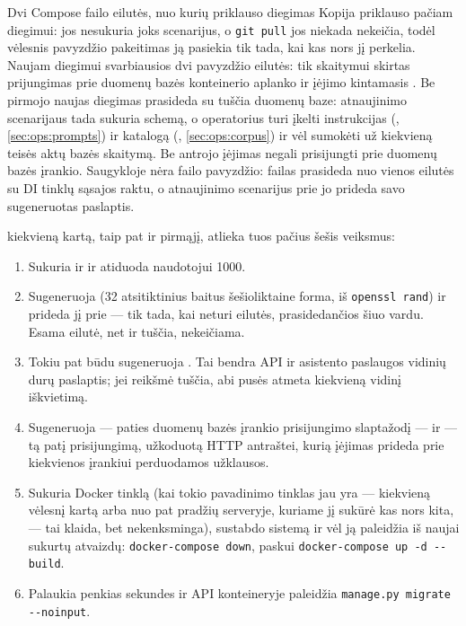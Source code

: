 \begin{notebox}{Dvi Compose failo eilutės, nuo kurių priklauso diegimas}
Kopija priklauso pačiam diegimui: jos nesukuria joks scenarijus, o \texttt{git pull} jos niekada
nekeičia, todėl vėlesnis pavyzdžio pakeitimas ją pasiekia tik tada, kai kas nors jį perkelia.
Naujam diegimui svarbiausios dvi pavyzdžio eilutės: tik skaitymui skirtas
 prijungimas prie duomenų
bazės konteinerio aplanko  ir įėjimo kintamasis
. Be pirmojo naujas diegimas prasideda su tuščia duomenų baze:
atnaujinimo scenarijaus  tada sukuria schemą, o operatorius turi įkelti instrukcijas
(, \cref{sec:ops:prompts}) ir katalogą (,
\cref{sec:ops:corpus}) ir vėl sumokėti už kiekvieną teisės aktų bazės skaitymą. Be antrojo įėjimas
negali prisijungti prie duomenų bazės įrankio. Saugykloje nėra failo  pavyzdžio:
failas prasideda nuo vienos eilutės su DI tinklų sąsajos raktu, o atnaujinimo scenarijus prie jo
prideda savo sugeneruotas paslaptis.
\end{notebox}

 kiekvieną kartą, taip pat ir pirmąjį, atlieka tuos pačius šešis
veiksmus:

\begin{enumerate}
  \item Sukuria  ir  ir atiduoda 
    naudotojui 1000.
  \item Sugeneruoja  (32 atsitiktinius baitus šešioliktaine forma, iš
    \texttt{openssl rand}) ir prideda jį prie  --- tik tada, kai  neturi
    eilutės, prasidedančios šiuo vardu. Esama eilutė, net ir tuščia, nekeičiama.
  \item Tokiu pat būdu sugeneruoja . Tai bendra API ir asistento
    paslaugos vidinių durų paslaptis; jei reikšmė tuščia, abi pusės atmeta kiekvieną vidinį
    iškvietimą.
  \item Sugeneruoja  --- paties duomenų bazės įrankio prisijungimo slaptažodį
    --- ir  --- tą patį prisijungimą, užkoduotą HTTP antraštei, kurią
    įėjimas prideda prie kiekvienos įrankiui perduodamos užklausos.
  \item Sukuria Docker tinklą  (kai tokio pavadinimo tinklas jau yra ---
    kiekvieną vėlesnį kartą arba nuo pat pradžių serveryje, kuriame jį sukūrė kas nors kita, ---
    tai klaida, bet nekenksminga), sustabdo sistemą ir vėl ją paleidžia iš naujai sukurtų atvaizdų:
    \texttt{docker-compose down}, paskui \texttt{docker-compose up -d -{}-build}.
  \item Palaukia penkias sekundes ir API konteineryje paleidžia
    \texttt{manage.py migrate -{}-noinput}.
\end{enumerate}

